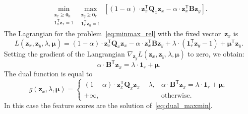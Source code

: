 \documentclass[12pt,oneside]{article}
\theoremstyle{definition}
\newcommand{\bz}{\mathbf{z}}
\newcommand{\bB}{\mathbf{B}}
\newcommand{\bQ}{\mathbf{Q}}
\newcommand{\T}{\mathsf{T}}
\newcommand{\bmu}{\boldsymbol{\mu}}
\newcommand{\bOne}{\boldsymbol{1}}
\newcommand{\bZero}{\boldsymbol{0}}
\begin{document}
\begin{equation}
\min_{\substack{\bz_x \geq \bZero_n \\ \bOne_n^{\T}\bz_x=1}} 	\max_{\substack{\bz_y \geq \bZero_r \\ \bOne_r^{\T}\bz_y=1}} \left[ (1 - \alpha) \cdot \bz_x^{\T} \bQ_x \bz_x - \alpha \cdot \bz_x^{\T} \bB \bz_y \right].
\label{eq:minmax_rel}
\end{equation}
The Lagrangian for the problem~\eqref{eq:minmax_rel} with the fixed vector~$\bz_x$ is
\begin{equation}
L(\bz_x, \bz_y, \lambda, \bmu) = (1 - \alpha) \cdot \bz_x^{\T} \bQ_x \bz_x - \alpha \cdot \bz_x^{\T} \bB \bz_y + \lambda \cdot  (\bOne_r^{\T} \bz_y - 1) + \bmu^{\T} \bz_y.
\end{equation}
Setting the gradient of the Langrangian $\nabla_{\bz_y} L(\bz_x, \bz_y, \lambda, \bmu)$ to zero, we obtain:
\begin{equation}
\alpha \cdot \bB^{\T} \bz_x = \lambda \cdot \bOne_r + \bmu.
\end{equation}
The dual function is equal to
\begin{equation}
g(\bz_x, \lambda, \bmu) =
\begin{cases}
(1 - \alpha) \cdot \bz_x^{\T} \bQ_x \bz_x - \lambda, & \alpha \cdot \bB^{\T} \bz_x = \lambda \cdot \bOne_r + \bmu;  \\
+ \infty, & \text{otherwise}.
\end{cases}
\end{equation}
In this case the feature scores are the solution of~\eqref{eq:dual_maxmin}.
\end{document}
